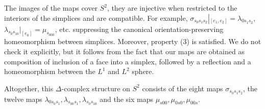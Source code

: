 \documentclass[11pt,a4paper]{report}
\begin{document}
\begin{Ex}
	  The images of the maps cover $S^2$, they are injective when restricted to the interiors of the simplices
	  and are compatible. For example, $ \sigma_{s_0s_1s_2}\left|_{[e_1,e_2]}\right. = \lambda_{0s_1s_2}$, 
	  $\lambda_{s_0s_10}|_{[e_0]}=\mu_{s_000}$, etc. suppressing the canonical orientation-preserving 
	  homeomorphism between simplices.
	  Moreover, property (3) is satisfied. We do not check it explicitly, but it follows from the fact that
	  our maps are obtained as composition of inclusion of a face into a simplex, followed by a reflection and 
	  a homeomorphism between the $L^1$ and $L^2$ sphere.
	  
	  Altogether, this $\Delta$-complex structure on $S^2$ consists of the eight maps $\sigma_{s_0s_1s_2}$, 
	  the twelve maps $\lambda_{0s_0s_1}, \lambda_{s_00s_1},\lambda_{s_0s_10}$ and the six maps
	  $\mu_{s00}, \mu_{0s0},\mu_{00s}$.








		     
		      
              
              
              

     \end{Ex}
     
\end{document}
